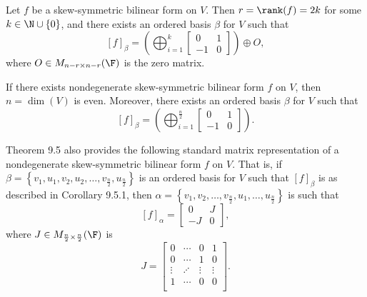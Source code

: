 \documentclass[linearalgebra]{subfiles}
\begin{document}
    \begin{theorem}{}
        Let $f$ be a skew-symmetric bilinear form on $V$. Then $r=\rank(f)=2k$ for some $k\in\N\cup\left\lbrace 0 \right\rbrace$, and there exists an ordered basis $\beta$ for $V$ such that
        \begin{equation*}
            \left[ f \right] _\beta = \left( \bigoplus^{k}_{i=1} \begin{bmatrix} 0 & 1 \\ -1 & 0 \end{bmatrix} \right) \oplus O,
        \end{equation*}
        where $O\in M_{n-r\times n-r}(\F)$ is the zero matrix. 
    \end{theorem}

    \begin{cor}{}
        If there exists nondegenerate skew-symmetric bilinear form $f$ on $V$, then $n=\dim(V)$ is even. Moreover, there exists an ordered basis $\beta$ for $V$ such that
        \begin{equation*}
            \left[ f \right] _\beta = \left( \bigoplus^{\frac{n}{2}}_{i=1} \begin{bmatrix} 0 & 1 \\ -1 & 0 \end{bmatrix} \right).
        \end{equation*}
    \end{cor}	

    \begin{remark}
        Theorem 9.5 also provides the following standard matrix representation of a nondegenerate skew-symmetric bilinear form $f$ on $V$. That is, if $\beta = \left\lbrace v_1,u_1, v_2,u_2,\ldots,v_{\frac{n}{2}}, u_{\frac{n}{2}} \right\rbrace $ is an ordered basis for $V$ such that $\left[ f \right] _\beta$ is as described in Corollary 9.5.1, then $\alpha = \left\lbrace v_1,v_2,\ldots, v_{\frac{n}{2}}, u_1, \ldots, u_{\frac{n}{2}} \right\rbrace$ is such that
        \begin{equation*}
            \left[ f \right] _\alpha = \begin{bmatrix} 0 & J \\ -J & 0 \end{bmatrix},
        \end{equation*}
        where $J\in M_{\frac{n}{2}\times \frac{n}{2}}(\F)$ is
        \begin{equation*}
            J = 
            \begin{bmatrix}
                0 & \cdots & 0 & 1 \\
                0 & \cdots & 1 & 0 \\
                \vdots & \iddots & \vdots & \vdots \\
                1 & \cdots & 0 & 0 \\
            \end{bmatrix}.
        \end{equation*}
    \end{remark}
\end{document}
